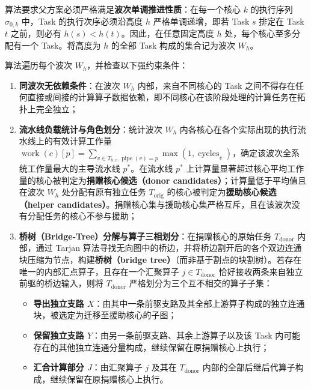 \documentclass[anonymous,notoc]{gmcm2026}
\providecommand{\tightlist}{\setlength{\itemsep}{0pt}\setlength{\parskip}{0pt}}
\begin{document}
算法要求父方案必须严格满足\textbf{波次单调推进性质}：在每一个核心 \(k\) 的执行序列 \(\sigma_{0,k}\) 中，Task 的执行次序必须沿高度 \(h\) 严格单调递增，即若 Task \(s\) 排定在 Task \(t\) 之前，则必有 \(h(s) < h(t)\)。因此，在任意固定高度 \(h\) 处，每个核心至多分配有一个 Task。将高度为 \(h\) 的全部 Task 构成的集合记为波次 \(W_h\)。

算法遍历每个波次 \(W_h\)，并检查以下强约束条件：

\begin{enumerate}
\def\labelenumi{\arabic{enumi}.}
\tightlist
\item
  \textbf{同波次无依赖条件}：在波次 \(W_h\) 内部，来自不同核心的 Task 之间不得存在任何直接或间接的计算算子数据依赖，即不同核心在该阶段处理的计算任务在拓扑上完全独立；
\item
  \textbf{流水线负载统计与角色划分}：统计波次 \(W_h\) 内各核心在各个实际出现的执行流水线上的有效计算工作量 \(\operatorname{work}(c)[p] = \sum_{v \in T_{h, c}, \operatorname{pipe}(v) = p} \max(1, \operatorname{cycles}_v)\)，确定该波次全系统工作量最大的主导流水线 \(p^*\)。在流水线 \(p^*\) 上计算量显著超过核心平均工作量的核心被判定为\textbf{捐赠核心候选（donor candidates）}；计算量低于平均值且在波次 \(W_h\) 处分配有原有独立任务 \(T_{\mathrm{orig}}\) 的核心被判定为\textbf{援助核心候选（helper candidates）}。捐赠核心集与援助核心集严格互斥，且在该波次没有分配任务的核心不参与援助；
\item
  \textbf{桥树（Bridge-Tree）分解与算子三相划分}：在捐赠核心的原始任务 \(T_{\mathrm{donor}}\) 内部，通过 Tarjan 算法寻找无向图中的桥边，并将桥边割开后的各个双边连通块压缩为节点，构建\textbf{桥树（bridge tree）}（而非基于割点的块割树）。若存在唯一的内部汇点算子，且存在一个汇聚算子 \(j \in T_{\mathrm{donor}}\) 恰好接收两条来自独立前驱的桥边输入，则将 \(T_{\mathrm{donor}}\) 严格划分为三个互不相交的算子子集：

  \begin{itemize}
  \tightlist
  \item
    \textbf{导出独立支路 \(X\)}：由其中一条前驱支路及其全部上游算子构成的独立连通块，被选定为迁移至援助核心的子图；
  \item
    \textbf{保留独立支路 \(Y\)}：由另一条前驱支路、其余上游算子以及该 Task 内可能存在的其他独立连通分量构成，继续保留在原捐赠核心上执行；
  \item
    \textbf{汇合计算部分 \(J\)}：由汇聚算子 \(j\) 及其在 \(T_{\mathrm{donor}}\) 内部的全部后继后代算子构成，继续保留在原捐赠核心上执行。
  \end{itemize}
\end{enumerate}
\end{document}
